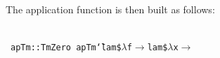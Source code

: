 \documentclass[9pt,authoryear]{sigplanconf}
\begin{document}
%
The application function is then built as follows{:}%


{\nopagebreak }

%
%
%
~\\~\vphantom{$\{$}\texttt{apTm\makebox[1.22ex][c]{\_{}}}\texttt{\mbox{\hspace{0.50em}}}\texttt{{:}{:}}\texttt{\mbox{\hspace{0.50em}}}\texttt{Tm}\texttt{\mbox{\hspace{0.50em}}}\texttt{Zero}\texttt{{\nopagebreak \newline%
}\vphantom{$\{$}}\texttt{apTm\makebox[1.22ex][c]{\_{}}}\texttt{\mbox{\hspace{0.50em}}}\texttt{{\char `\=}}\texttt{\mbox{\hspace{0.50em}}}\texttt{lam}\texttt{\mbox{\hspace{0.50em}}}\texttt{\${}}\texttt{\mbox{\hspace{0.50em}}}\texttt{$ \lambda $}\texttt{\mbox{\hspace{0.50em}}}\texttt{f}\texttt{\mbox{\hspace{0.50em}}}\texttt{$ \rightarrow $}\texttt{\mbox{\hspace{0.50em}}}\texttt{lam}\texttt{\mbox{\hspace{0.50em}}}\texttt{\${}}\texttt{\mbox{\hspace{0.50em}}}\texttt{$ \lambda $}\texttt{\mbox{\hspace{0.50em}}}\texttt{x}\texttt{\mbox{\hspace{0.50em}}}\texttt{$ \rightarrow $}\texttt{{\nopagebreak \newline%
}}
\end{document}
